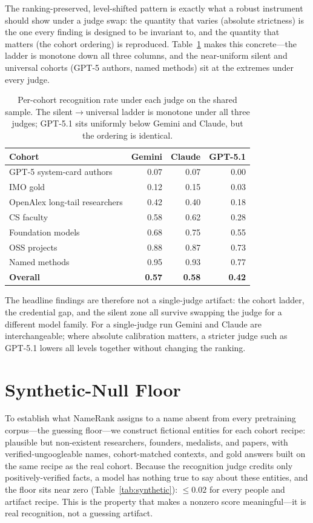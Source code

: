 The ranking-preserved, level-shifted pattern is exactly what a robust instrument should show under a judge swap: the quantity that varies (absolute strictness) is the one every finding is designed to be invariant to, and the quantity that matters (the cohort ordering) is reproduced. Table~\ref{tab:cross-judge-bias} makes this concrete---the ladder is monotone down all three columns, and the near-uniform silent and universal cohorts (GPT-5 authors, named methods) sit at the extremes under every judge.

\begin{table}[!htbp]
\centering
\small
\caption{Per-cohort recognition rate under each judge on the shared sample. The silent$\to$universal ladder is monotone under all three judges; GPT-5.1 sits uniformly below Gemini and Claude, but the ordering is identical.}
\label{tab:cross-judge-bias}
\begin{tabular}{lrrr}
\toprule
Cohort & Gemini & Claude & GPT-5.1 \\
\midrule
GPT-5 system-card authors & 0.07 & 0.07 & 0.00 \\
IMO gold & 0.12 & 0.15 & 0.03 \\
OpenAlex long-tail researchers & 0.42 & 0.40 & 0.18 \\
CS faculty & 0.58 & 0.62 & 0.28 \\
Foundation models & 0.68 & 0.75 & 0.55 \\
OSS projects & 0.88 & 0.87 & 0.73 \\
Named methods & 0.95 & 0.93 & 0.77 \\
\midrule
\textbf{Overall} & \textbf{0.57} & \textbf{0.58} & \textbf{0.42} \\
\bottomrule
\end{tabular}
\end{table}

The headline findings are therefore not a single-judge artifact: the cohort ladder, the credential gap, and the silent zone all survive swapping the judge for a different model family. For a single-judge run Gemini and Claude are interchangeable; where absolute calibration matters, a stricter judge such as GPT-5.1 lowers all levels together without changing the ranking.

\section{Synthetic-Null Floor}
\label{app:synthetic}

To establish what NameRank assigns to a name absent from every pretraining corpus---the guessing floor---we construct fictional entities for each cohort recipe: plausible but non-existent researchers, founders, medalists, and papers, with verified-ungoogleable names, cohort-matched contexts, and gold answers built on the same recipe as the real cohort. Because the recognition judge credits only positively-verified facts, a model has nothing true to say about these entities, and the floor sits near zero (Table~\ref{tab:synthetic}): ${\leq}0.02$ for every people and artifact recipe. This is the property that makes a nonzero score meaningful---it is real recognition, not a guessing artifact.

